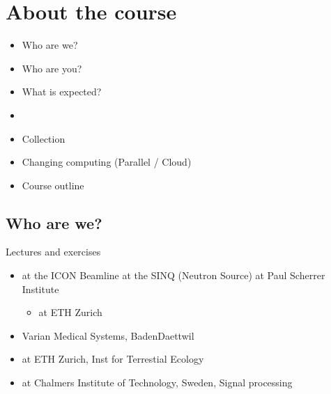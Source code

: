 \documentclass[letterpaper,10pt,english]{sphinxmanual}
\begin{document}
\chapter{About the course}
\label{\detokenize{01-Introduction:about-the-course}}\begin{itemize}
\item {} 
\sphinxAtStartPar
Who are we?

\item {} 
\sphinxAtStartPar
Who are you?

\item {} 
\sphinxAtStartPar
What is expected?

\item {} 
\sphinxAtStartPar
{}

\item {} 
\sphinxAtStartPar
Collection

\item {} 
\sphinxAtStartPar
Changing computing (Parallel / Cloud)

\item {} 
\sphinxAtStartPar
Course outline

\end{itemize}


\section{Who are we?}
\label{\detokenize{01-Introduction:who-are-we}}


\sphinxAtStartPar
Lectures and exercises


\begin{itemize}
\item {} 
\sphinxAtStartPar
{} at the ICON Beamline at the SINQ (Neutron Source) at Paul Scherrer Institute
\begin{itemize}
\item {} 
\sphinxAtStartPar
{} at ETH Zurich

\end{itemize}

\item {} 
\sphinxAtStartPar
{} Varian Medical Systems, Baden\sphinxhyphen{}Daettwil

\item {} 
\sphinxAtStartPar
{} at ETH Zurich, Inst for Terrestial Ecology

\item {} 
\sphinxAtStartPar
{} at Chalmers Institute of Technology, Sweden, Signal processing

\end{itemize}
\end{document}
